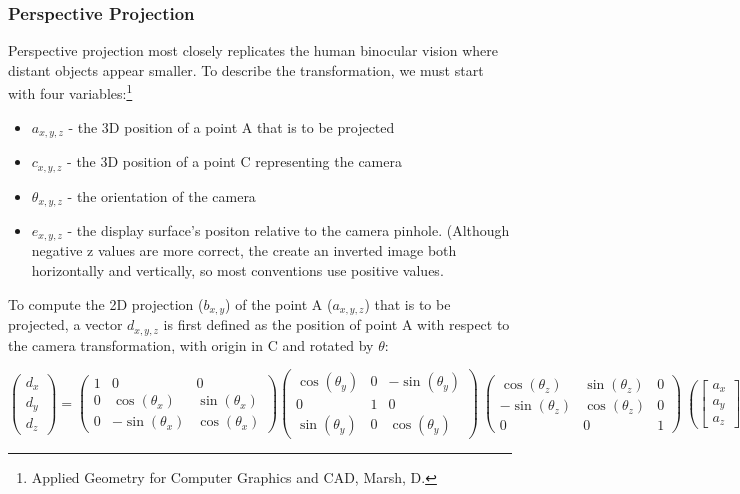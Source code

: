 \documentclass{article}
\begin{document}
\subsubsection{Perspective Projection}
Perspective projection most closely replicates the human binocular vision where distant objects appear smaller. To describe the transformation, we must start with four variables:\footnote{Applied Geometry for Computer Graphics and CAD, Marsh, D.}

\begin{itemize}
  \item $a_{x, y, z}$ - the 3D position of a point A that is to be projected
  \item $c_{x, y, z}$ - the 3D position of a point C representing the camera
  \item $\theta_{x, y, z}$ - the orientation of the camera
  \item $e_{x, y, z}$ - the display surface's positon relative to the camera pinhole. (Although negative z values are more correct, the create an inverted image both horizontally and vertically, so most conventions use positive values.
\end{itemize}

To compute the 2D projection ($b_{x, y}$) of the point A ($a_{x, y, z}$) that is to be projected, a vector $d_{x, y, z}$ is first defined as the position of point A with respect to the camera transformation, with origin in C and rotated by $\theta$:

\[\begin{pmatrix}
  d_{x} \\
  d_{y} \\
  d_{z} 
 \end{pmatrix}
=
\begin{pmatrix}
  1 & 0 & 0 \\
  0 & \cos(\theta_{x}) & \sin(\theta_{x}) \\
  0 &  -\sin(\theta_{x}) & \cos(\theta_{x}) 
 \end{pmatrix}
\begin{pmatrix}
  \cos(\theta_{y}) & 0 & -\sin(\theta_{y}) \\
  0 & 1 & 0 \\
  \sin(\theta_{y}) & 0  & \cos(\theta_{y}) 
 \end{pmatrix}\
\begin{pmatrix}
  \cos(\theta_{z}) & \sin(\theta_{z})  & 0  \\
  -\sin(\theta_{z}) & \cos(\theta_{z}) & 0 \\
  0 & 0  & 1 
 \end{pmatrix}\
\left(
\begin{bmatrix}
  a_{x} \\
  a_{y} \\
  a_{z} 
\end{bmatrix}\
-
\begin{bmatrix}
  c_{x} \\
  c_{y} \\
  c_{z} 
\end{bmatrix}\
\right)\]
\end{document}
